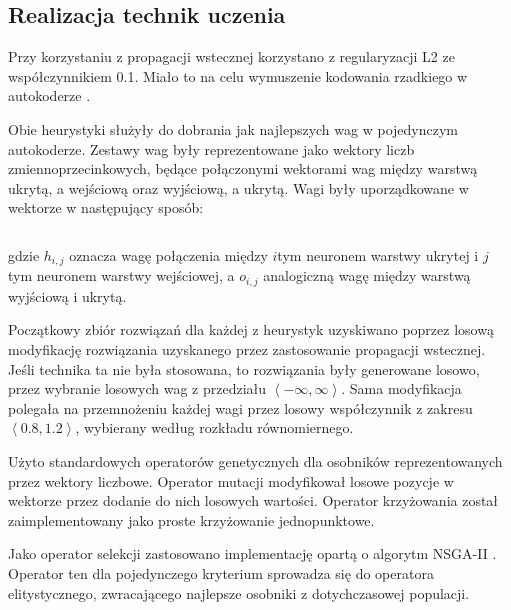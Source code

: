\documentclass[11pt,a4paper,oneside]{report}
\begin{document}

\subsection{Realizacja technik uczenia}

Przy korzystaniu z propagacji wstecznej korzystano z regularyzacji L2 \cite{girosi1995regularization} ze współczynnikiem 0.1. Miało to na celu wymuszenie kodowania rzadkiego w autokoderze \cite{ngiam2011optimization}.

Obie heurystyki służyły do dobrania jak najlepszych wag w pojedynczym autokoderze. Zestawy wag były reprezentowane jako wektory liczb zmiennoprzecinkowych, będące połączonymi wektorami wag między warstwą ukrytą, a wejściową oraz wyjściową, a ukrytą. Wagi były uporządkowane w wektorze w następujący sposób:

\begin{displaymath}
	[ h_{0, 0}, h_{0, 1}, \ldots, h_{1, 0}, h_{1, 1}, \ldots, o_{0, 0}, o_{0, 1}, \ldots, o_{1, 0}, o_{1, 1}, \ldots ]
\end{displaymath}

gdzie $h_{i, j}$ oznacza wagę połączenia między $i$tym neuronem warstwy ukrytej i $j$tym neuronem warstwy wejściowej, a $o_{i, j}$ analogiczną wagę między warstwą wyjściową i ukrytą.

Początkowy zbiór rozwiązań dla każdej z heurystyk uzyskiwano poprzez losową modyfikację rozwiązania uzyskanego przez zastosowanie propagacji wstecznej. Jeśli technika ta nie była stosowana, to rozwiązania były generowane losowo, przez wybranie losowych wag z przedziału $\left\langle -\infty, \infty \right\rangle $. Sama modyfikacja polegała na przemnożeniu każdej wagi przez losowy współczynnik z zakresu $\left\langle 0.8, 1.2 \right\rangle $, wybierany według rozkładu równomiernego.

Użyto standardowych operatorów genetycznych dla osobników reprezentowanych przez wektory liczbowe. Operator mutacji modyfikował losowe pozycje w wektorze przez dodanie do nich losowych wartości. Operator krzyżowania został zaimplementowany jako proste krzyżowanie jednopunktowe.

Jako operator selekcji zastosowano implementację opartą o algorytm NSGA-II \cite{deb2002fast}. Operator ten dla pojedynczego kryterium sprowadza się do operatora elitystycznego, zwracającego najlepsze osobniki z dotychczasowej populacji.
\end{document}
